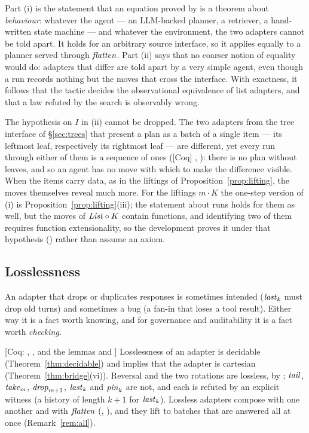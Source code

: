 \documentclass{fundam}
\begin{document}
Part (i) is the statement that an equation proved by  is a theorem about
\emph{behaviour}: whatever the agent --- an LLM-backed planner, a retriever, a
hand-written state machine --- and whatever the environment, the two adapters cannot be
told apart.  It holds for an arbitrary source interface, so it applies equally to a
planner served through $\mathit{flatten}$.  Part (ii) says that no coarser notion of
equality would do: adapters that differ are told apart by a very simple agent, even
though a run records nothing but the moves that cross the interface.  With exactness, it
follows that the tactic  decides the observational equivalence of list
adapters, and that a law refuted by the search is observably wrong.

The hypothesis on $I$ in (ii) cannot be dropped.  The two adapters from the tree
interface of \S\ref{sec:trees} that present a plan as a batch of a single item --- its
leftmost leaf, respectively its rightmost leaf --- are different, yet every run through
either of them is a sequence of ones (\textsf{[Coq]} ,
): there is no plan without leaves, and so an agent has no move with
which to make the difference visible.  When the items carry data, as in the liftings of
Proposition~\ref{prop:lifting}, the moves themselves reveal much more.  For the liftings
$m \cdot K$ the one-step version of (i) is Proposition~\ref{prop:lifting}(iii); the
statement about runs holds for them as well, but the moves of $\mathit{List} \circ K$ contain
functions, and identifying two of them requires function extensionality, so the
development proves it under that hypothesis () rather than
assume an axiom.

\subsection{Losslessness}

An adapter that drops or duplicates responses is sometimes intended ($\mathit{last}_k$ must drop
old turns) and sometimes a bug (a fan-in that loses a tool result).  Either way it is a
fact worth knowing, and for governance and auditability it is a fact worth
\emph{checking}.

\begin{proposition}\label{prop:lossless}
  \textsf{[Coq: , , and the lemmas
   and ]}
  Losslessness of an adapter is decidable (Theorem~\ref{thm:decidable}) and implies that
  the adapter is cartesian (Theorem~\ref{thm:bridge}(vi)).  Reversal and the two rotations
  are lossless, by ; $\mathit{tail}$, $\mathit{take}_m$, $\mathit{drop}_{m+1}$,
  $\mathit{last}_k$ and $\mathit{pin}_k$ are not, and each is refuted by an explicit witness (a history of
  length $k + 1$ for $\mathit{last}_k$).  Lossless adapters compose with one another and with
  $\mathit{flatten}$ (, ), and they lift to
  batches that are answered all at once (Remark~\ref{rem:all}).
\end{proposition}
\end{document}
